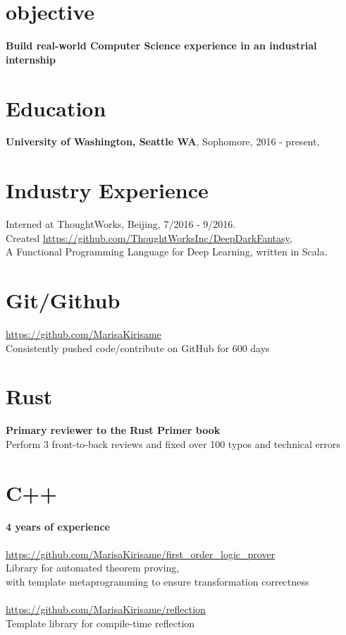 \documentclass[margin,line]{res}
\begin{document}

\begin{resume}



\section{\sc objective}
\textbf{Build real-world Computer Science experience in an industrial internship}

\section{\sc Education}
\textbf{University of Washington, Seattle WA}, Sophomore, 2016 - present, 

\section{Industry Experience} Interned at ThoughtWorks, Beijing, 7/2016 - 9/2016. \\ Created \url{https://github.com/ThoughtWorksInc/DeepDarkFantasy}, \\
A Functional Programming Language for Deep Learning, written in Scala. 

\section{\sc Git/Github}
\url{https://github.com/MarisaKirisame} \\
Consistently pushed code/contribute on GitHub for 600 days

\section{\sc Rust}
\textbf{Primary reviewer to the Rust Primer book} \\
Perform 3 front-to-back reviews and fixed over 100 typos and technical errors

\section{\sc C++} 
\textbf{4 years of experience} \\
\\
\url{https://github.com/MarisaKirisame/first_order_logic_prover} \\
Library for automated theorem proving, \\
with template metaprogramming to ensure transformation correctness \\
\\
\url{https://github.com/MarisaKirisame/reflection} \\
Template library for compile-time reflection


\end{resume}
\end{document}
